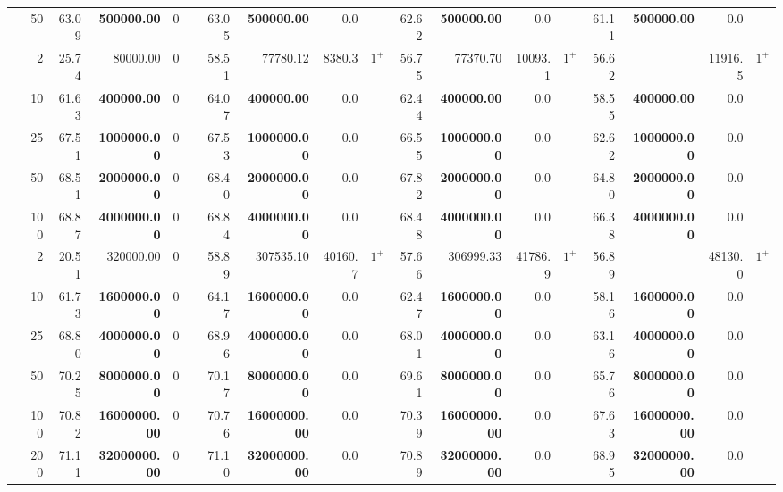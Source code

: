 \begin{table}
\begin{tabular}[t]{rrrrrrrrrrrrrrrrrr}
\multirow{-4}{*}{\raggedleft\arraybackslash 100} & 50 & 63.09 & \textbf{500000.00} & 0 &  & 63.05 & \textbf{500000.00} & 0.0 &  & 62.62 & \textbf{500000.00} & 0.0 &  & 61.11 & \textbf{500000.00} & 0.0 & \\
\cmidrule{1-18}
 & 2 & 25.74 & 80000.00 & 0 &  & 58.51 & 77780.12 & 8380.3 & \textcolor{uniform1}{$\text{1}^{+}$} & 56.75 & 77370.70 & 10093.1 & \textcolor{uniform1}{$\text{1}^{+}$} & 56.62 & \cellcolor{gray!20}{\textbf{76611.89}} & 11916.5 & \textcolor{uniform1}{$\text{1}^{+}$}\\

 & 10 & 61.63 & \textbf{400000.00} & 0 &  & 64.07 & \textbf{400000.00} & 0.0 &  & 62.44 & \textbf{400000.00} & 0.0 &  & 58.55 & \textbf{400000.00} & 0.0 & \\

 & 25 & 67.51 & \textbf{1000000.00} & 0 &  & 67.53 & \textbf{1000000.00} & 0.0 &  & 66.55 & \textbf{1000000.00} & 0.0 &  & 62.62 & \textbf{1000000.00} & 0.0 & \\

 & 50 & 68.51 & \textbf{2000000.00} & 0 &  & 68.40 & \textbf{2000000.00} & 0.0 &  & 67.82 & \textbf{2000000.00} & 0.0 &  & 64.80 & \textbf{2000000.00} & 0.0 & \\

\multirow{-5}{*}{\raggedleft\arraybackslash 200} & 100 & 68.87 & \textbf{4000000.00} & 0 &  & 68.84 & \textbf{4000000.00} & 0.0 &  & 68.48 & \textbf{4000000.00} & 0.0 &  & 66.38 & \textbf{4000000.00} & 0.0 & \\
\cmidrule{1-18}
 & 2 & 20.51 & 320000.00 & 0 &  & 58.89 & 307535.10 & 40160.7 & \textcolor{uniform1}{$\text{1}^{+}$} & 57.66 & 306999.33 & 41786.9 & \textcolor{uniform1}{$\text{1}^{+}$} & 56.89 & \cellcolor{gray!20}{\textbf{305182.20}} & 48130.0 & \textcolor{uniform1}{$\text{1}^{+}$}\\

 & 10 & 61.73 & \textbf{1600000.00} & 0 &  & 64.17 & \textbf{1600000.00} & 0.0 &  & 62.47 & \textbf{1600000.00} & 0.0 &  & 58.16 & \textbf{1600000.00} & 0.0 & \\

 & 25 & 68.80 & \textbf{4000000.00} & 0 &  & 68.96 & \textbf{4000000.00} & 0.0 &  & 68.01 & \textbf{4000000.00} & 0.0 &  & 63.16 & \textbf{4000000.00} & 0.0 & \\

 & 50 & 70.25 & \textbf{8000000.00} & 0 &  & 70.17 & \textbf{8000000.00} & 0.0 &  & 69.61 & \textbf{8000000.00} & 0.0 &  & 65.76 & \textbf{8000000.00} & 0.0 & \\

 & 100 & 70.82 & \textbf{16000000.00} & 0 &  & 70.76 & \textbf{16000000.00} & 0.0 &  & 70.39 & \textbf{16000000.00} & 0.0 &  & 67.63 & \textbf{16000000.00} & 0.0 & \\

\multirow{-6}{*}{\raggedleft\arraybackslash 400} & 200 & 71.11 & \textbf{32000000.00} & 0 &  & 71.10 & \textbf{32000000.00} & 0.0 &  & 70.89 & \textbf{32000000.00} & 0.0 &  & 68.95 & \textbf{32000000.00} & 0.0 & \\
\bottomrule
\end{tabular}
\end{table}
